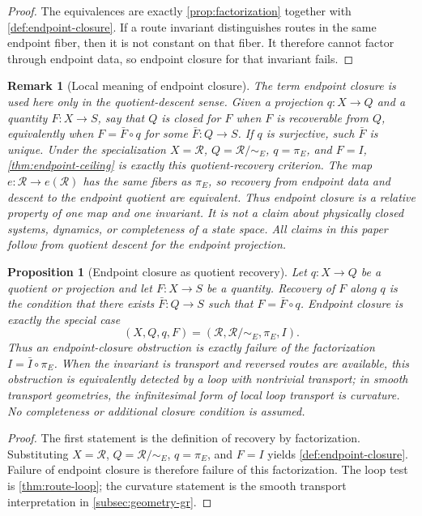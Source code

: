 \documentclass[12pt]{article}
\newtheorem{proposition}[proposition]{Proposition}
\newtheorem{remark}[remark]{Remark}
\newcommand{\calR}{\mathcal{R}}
\begin{document}
\begin{proof}
The equivalences are exactly \cref{prop:factorization} together with
\cref{def:endpoint-closure}. If a route invariant distinguishes
routes in the same endpoint fiber, then it is not constant on that fiber.
It therefore cannot factor through endpoint data, so endpoint closure for
that invariant fails.
\end{proof}

\begin{remark}[Local meaning of endpoint closure]
\label{rem:recoverability-closure}
The term endpoint closure is used here only in the quotient-descent
sense. Given a projection $q:X\to Q$ and a quantity $F:X\to S$, say
that $Q$ is closed for $F$ when $F$ is recoverable from $Q$, equivalently
when $F=\bar F\circ q$ for some $\bar F:Q\to S$. If $q$ is
surjective, such $\bar F$ is unique. Under the specialization
$X=\calR$, $Q=\calR/{\sim_E}$, $q=\pi_E$, and $F=I$,
\cref{thm:endpoint-ceiling} is exactly this quotient-recovery criterion.
The map $e:\calR\to e(\calR)$ has the same fibers as $\pi_E$, so
recovery from endpoint data and descent to the endpoint quotient are
equivalent. Thus endpoint closure is a relative property of one map and
one invariant. It is not a claim about physically closed systems,
dynamics, or completeness of a state space.
All claims in this paper follow from quotient descent for the endpoint
projection.
\end{remark}

\begin{proposition}[Endpoint closure as quotient recovery]
\label{prop:closure-hierarchy}
Let $q:X\to Q$ be a quotient or projection and let $F:X\to S$ be a
quantity. Recovery of $F$ along $q$ is the condition that there exists
$\bar F:Q\to S$ such that $F=\bar F\circ q$. Endpoint closure is
exactly the special case
\[
  (X,Q,q,F)=(\calR,\calR/{\sim_E},\pi_E,I).
\]
Thus an endpoint-closure obstruction is exactly failure of the
factorization $I=\bar I\circ\pi_E$. When the invariant is transport and
reversed routes are available, this obstruction is equivalently detected
by a loop with nontrivial transport; in smooth transport geometries, the
infinitesimal form of local loop transport is curvature. No completeness
or additional closure condition is assumed.
\end{proposition}

\begin{proof}
The first statement is the definition of recovery by factorization.
Substituting $X=\calR$, $Q=\calR/{\sim_E}$, $q=\pi_E$, and $F=I$
yields \cref{def:endpoint-closure}. Failure of endpoint closure is
therefore failure of this factorization. The loop test is
\cref{thm:route-loop}; the curvature statement is the smooth transport
interpretation in \cref{subsec:geometry-gr}.
\end{proof}
\end{document}
